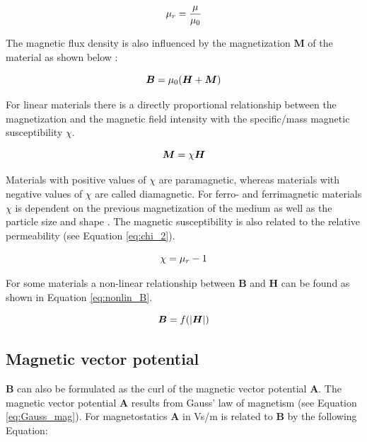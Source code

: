 \begin{equation}
\label{eq:mu_r}
\centering
\mu_{r} = \frac{\mu}{\mu_{0}}
\end{equation}


The magnetic flux density is also influenced by the magnetization $\boldsymbol{M}$ of the material as shown below \cite{ichimura1989maxwell}: 

\begin{equation}
\label{eq:Mag}
\centering
\boldsymbol{B} = \mu_{0}(\boldsymbol{H} + \boldsymbol{M})
\end{equation}

For linear materials there is a directly proportional relationship between the magnetization and the magnetic field intensity with the specific/mass magnetic susceptibility $\chi$.  

\begin{equation}
\label{eq:chi}
\centering
\boldsymbol{M} = \chi\boldsymbol{H}
\end{equation}

Materials with positive values of $\chi$ are paramagnetic, whereas materials with negative values of $\chi$ are called diamagnetic. For ferro- and ferrimagnetic materials $\chi$ is dependent on the previous magnetization of the medium as well as the particle size and shape \cite{michalowsky2006magnettechnik}. The magnetic susceptibility is also related to the relative permeability (see Equation \ref{eq:chi_2}).

\begin{equation}
\label{eq:chi_2}
\centering
\chi = \mu_{r}-1
\end{equation}

For some materials a non-linear relationship between $\boldsymbol{B}$ and $\boldsymbol{H}$ can be found as shown in Equation \ref{eq:nonlin_B}.

\begin{equation}
\label{eq:nonlin_B}
\centering
\boldsymbol{B} = f(\vert\boldsymbol{H}\vert)
\end{equation}

\subsection{Magnetic vector potential}
\label{subsec:Mag_pot}

$\boldsymbol{B}$ can also be formulated as the curl of the magnetic vector potential $\boldsymbol{A}$. The magnetic vector potential $\boldsymbol{A}$ results from Gauss' law of magnetism (see Equation \ref{eq:Gauss_mag}). For magnetostatics $\boldsymbol{A}$ in Vs/m is related to $\boldsymbol{B}$ by the following Equation:  

